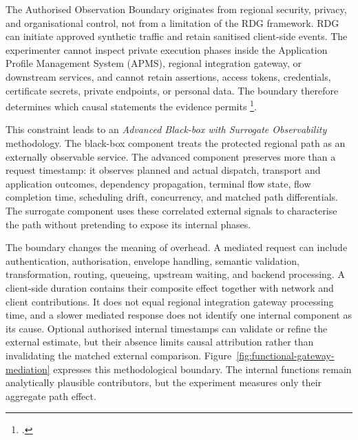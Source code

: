 \noindent The Authorised Observation Boundary originates from regional security,
privacy, and organisational control, not from a limitation of the RDG
framework. RDG can initiate approved synthetic traffic and retain
sanitised client-side events. The experimenter cannot inspect private execution
phases inside the Application Profile Management System (APMS), regional
integration gateway, or downstream services, and cannot retain assertions, access tokens,
credentials, certificate secrets, private endpoints, or personal data. The
boundary therefore determines which causal statements the evidence permits
\footcite{apms-auth-v141,arsenal-security-v214}.

\noindent This constraint leads to an \emph{Advanced Black-box with Surrogate
Observability} methodology. The black-box component treats the protected regional
path as an externally observable service. The advanced component preserves more
than a request timestamp: it observes planned and actual dispatch, transport and
application outcomes, dependency propagation, terminal flow state, flow
completion time, scheduling drift, concurrency, and matched path differentials.
The surrogate component uses these correlated external signals to characterise
the path without pretending to expose its internal phases.

\noindent The boundary changes the meaning of overhead. A mediated request can include
authentication, authorisation, envelope handling, semantic validation,
transformation, routing, queueing, upstream waiting, and backend processing. A
client-side duration contains their composite effect together with network and
client contributions. It does not equal regional integration gateway processing time, and a slower
mediated response does not identify one internal component as its cause. Optional
authorised internal timestamps can validate or refine the external estimate, but
their absence limits causal attribution rather than invalidating the matched
external comparison. Figure~\ref{fig:functional-gateway-mediation} expresses this methodological
boundary. The internal functions remain analytically plausible contributors, but
the experiment measures only their aggregate path effect.

